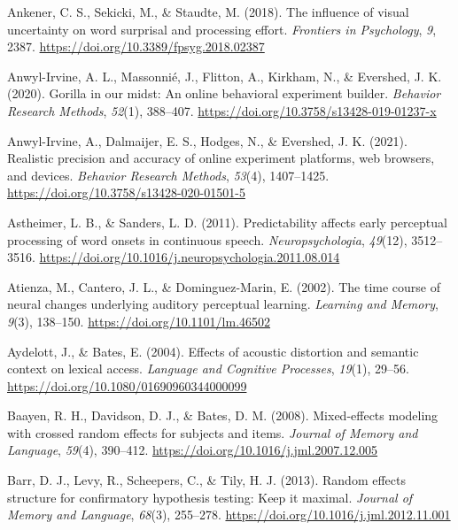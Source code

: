\documentclass[a4paper, nobind]{templates/ociamthesis}
\newlength{\cslhangindent}
\newenvironment{CSLReferences}[2] %
 {%
  \setlength{\parindent}{0pt}
  \ifodd #1
  \let\oldpar\par
  \def\par{\hangindent=\cslhangindent\oldpar}
  \fi
  \setlength{\parskip}{1mm}
  \setlength{\baselineskip}{6mm}
 }%
 {}
\begin{document}
\begin{CSLReferences}{1}{0}
\leavevmode{}%
Ankener, C. S., Sekicki, M., \& Staudte, M. (2018). {The influence of visual uncertainty on word surprisal and processing effort}. \emph{Frontiers in Psychology}, \emph{9}, 2387. \url{https://doi.org/10.3389/fpsyg.2018.02387}

\leavevmode{}%
Anwyl-Irvine, A. L., Massonnié, J., Flitton, A., Kirkham, N., \& Evershed, J. K. (2020). {Gorilla in our midst: An online behavioral experiment builder}. \emph{Behavior Research Methods}, \emph{52}(1), 388--407. \url{https://doi.org/10.3758/s13428-019-01237-x}

\leavevmode{}%
Anwyl-Irvine, A., Dalmaijer, E. S., Hodges, N., \& Evershed, J. K. (2021). {Realistic precision and accuracy of online experiment platforms, web browsers, and devices}. \emph{Behavior Research Methods}, \emph{53}(4), 1407--1425. \url{https://doi.org/10.3758/s13428-020-01501-5}

\leavevmode{}%
Astheimer, L. B., \& Sanders, L. D. (2011). {Predictability affects early perceptual processing of word onsets in continuous speech}. \emph{Neuropsychologia}, \emph{49}(12), 3512--3516. \url{https://doi.org/10.1016/j.neuropsychologia.2011.08.014}

\leavevmode{}%
Atienza, M., Cantero, J. L., \& Dominguez-Marin, E. (2002). {The time course of neural changes underlying auditory perceptual learning}. \emph{Learning and Memory}, \emph{9}(3), 138--150. \url{https://doi.org/10.1101/lm.46502}

\leavevmode{}%
Aydelott, J., \& Bates, E. (2004). {Effects of acoustic distortion and semantic context on lexical access}. \emph{Language and Cognitive Processes}, \emph{19}(1), 29--56. \url{https://doi.org/10.1080/01690960344000099}

\leavevmode{}%
Baayen, R. H., Davidson, D. J., \& Bates, D. M. (2008). {Mixed-effects modeling with crossed random effects for subjects and items}. \emph{Journal of Memory and Language}, \emph{59}(4), 390--412. \url{https://doi.org/10.1016/j.jml.2007.12.005}

\leavevmode{}%
Barr, D. J., Levy, R., Scheepers, C., \& Tily, H. J. (2013). Random effects structure for confirmatory hypothesis testing: Keep it maximal. \emph{Journal of Memory and Language}, \emph{68}(3), 255--278. \url{https://doi.org/10.1016/j.jml.2012.11.001}


\end{CSLReferences}
\end{document}
